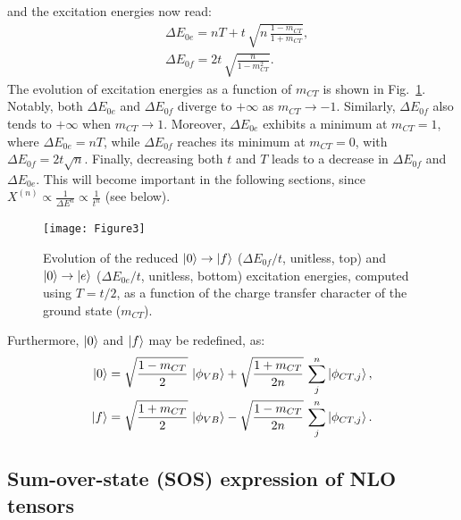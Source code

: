 \documentclass[USenglish]{article}
\begin{document}
and the excitation energies now read:\begin{align}
	&\Delta E_{0e}= nT + t\,\sqrt{n\,\frac{1-m_{CT}}{1+m_{CT}}}, \nonumber\\
	&\Delta E_{0f} = 2t\,\sqrt{\frac{n}{1-m_{CT}^2}}. \label{eq:energiesmct}
\end{align}
The evolution of excitation energies as a function of $m_{CT}$ is shown in Fig.~\ref{fig:eexci}. Notably, both $\Delta E_{0e}$ and $\Delta E_{0f}$ diverge to $+\infty$ as $m_{CT} \to -1$. Similarly, $\Delta E_{0f}$ also tends to $+\infty$ when $m_{CT} \to 1$.  
Moreover, $\Delta E_{0e}$ exhibits a minimum at $m_{CT} = 1$, where $\Delta E_{0e} = nT$, while $\Delta E_{0f}$ reaches its minimum at $m_{CT} = 0$, with $\Delta E_{0f} = 2t\sqrt{n}$. Finally, decreasing both $t$ and $T$ leads to a decrease in $\Delta E_{0f}$ and $\Delta E_{0e}$. This will become important in the following sections, since $X^{(n)} \propto \frac{1}{\Delta E^n} \propto \frac{1}{t^n}$ (see below).

\begin{figure}[!h]
	\texttt{[image: Figure3]}
	\caption{Evolution of the reduced $\ket{0}\rightarrow\ket{f}$ ($\Delta E_{0f} / t$, unitless, top) and $\ket{0}\rightarrow\ket{e}$ ($\Delta E_{0e} /t$, unitless, bottom) excitation energies, computed using $T = t/2$, as a function of the charge transfer character of the ground state ($m_{CT}$).}
	\label{fig:eexci}
\end{figure}

Furthermore, $\ket{0}$ and $\ket{f}$ may be redefined, as:\begin{align}
\ket{0} &= \sqrt{\frac{1-m_{CT}}{2}}\,\ket{\phi_{VB}} + \sqrt{\frac{1+m_{CT}}{2n}}\,\sum_j^n \ket{\phi_{CT,j}},\nonumber\\
\ket{f} &= \sqrt{\frac{1+m_{CT}}{2}}\,\ket{\phi_{VB}} - \sqrt{\frac{1-m_{CT}}{2n}}\,\sum_j^n \ket{\phi_{CT,j}}.
\end{align}

\clearpage

\subsection{Sum-over-state (SOS) expression of NLO tensors}
\end{document}
